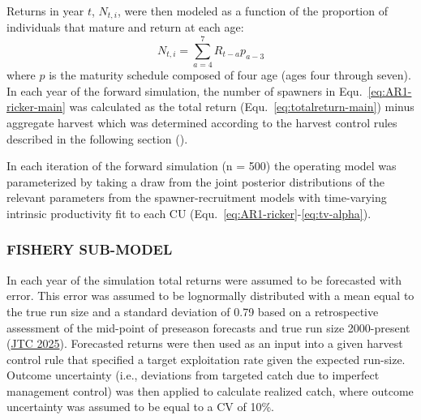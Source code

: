 \documentclass[11pt]{book}
\begin{document}
Returns in year \(t\), \(N_{t,i}\), were then modeled as a function of the proportion of individuals that mature and return at each age: \begin{equation}
  N_{t,i} = \sum_{a=4}^{7} R_{t-a} p_{a-3}
  \label{eq:totalreturn-main}
\end{equation}
where \(p\) is the maturity schedule composed of four age (ages four through seven). In each year of the forward simulation, the number of spawners in Equ.~\ref{eq:AR1-ricker-main} was calculated as the total return (Equ.~\ref{eq:totalreturn-main}) minus aggregate harvest which was determined according to the harvest control rules described in the following section ().

In each iteration of the forward simulation (n = 500) the operating model was parameterized by taking a draw from the joint posterior distributions of the relevant parameters from the spawner-recruitment models with time-varying intrinsic productivity fit to each CU (Equ.~\ref{eq:AR1-ricker}-\ref{eq:tv-alpha}).

\hypertarget{fishery-sub-model}{%
\subsubsection{FISHERY SUB-MODEL}\label{fishery-sub-model}}

In each year of the simulation total returns were assumed to be forecasted with error. This error was assumed to be lognormally distributed with a mean equal to the true run size and a standard deviation of 0.79 based on a retrospective assessment of the mid-point of preseason forecasts and true run size 2000-present (\protect\hyperlink{ref-JTC2025Report}{JTC 2025}). Forecasted returns were then used as an input into a given harvest control rule that specified a target exploitation rate given the expected run-size. Outcome uncertainty (i.e., deviations from targeted catch due to imperfect management control) was then applied to calculate realized catch, where outcome uncertainty was assumed to be equal to a CV of 10\%.
\end{document}
